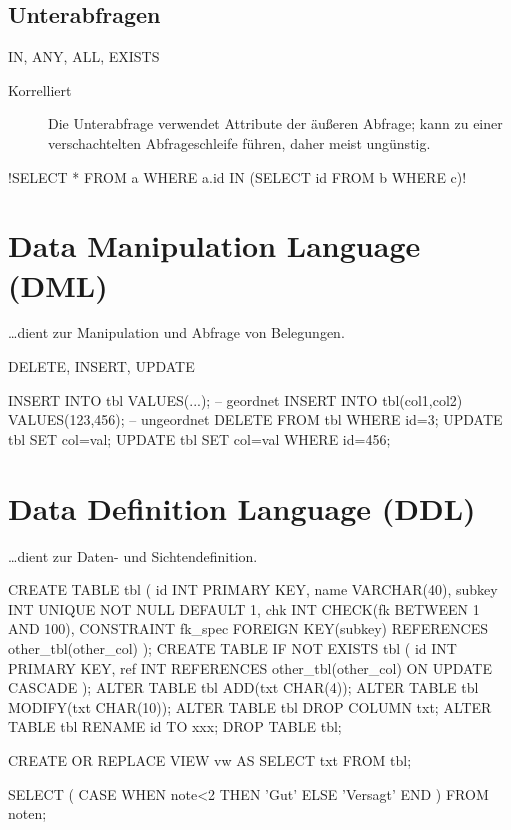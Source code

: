 \subsection{Unterabfragen}

IN, ANY, ALL, EXISTS
\begin{description}
  \item [{Korrelliert}] Die Unterabfrage verwendet Attribute der äußeren Abfrage; kann zu einer verschachtelten Abfrageschleife führen, daher meist ungünstig.
\end{description}


\sqli!SELECT * FROM a WHERE a.id IN (SELECT id FROM b WHERE c)!

\section{Data Manipulation Language (DML)}

\ldots dient zur Manipulation und Abfrage von Belegungen.

DELETE, INSERT, UPDATE

\begin{sqlcode}
INSERT INTO tbl VALUES(...); -- geordnet
INSERT INTO tbl(col1,col2) VALUES(123,456); -- ungeordnet
DELETE FROM tbl WHERE id=3;
UPDATE tbl SET col=val;
UPDATE tbl SET col=val WHERE id=456;
\end{sqlcode}


\section{Data Definition Language (DDL)}

\ldots dient zur Daten- und Sichtendefinition. 

\begin{sqlcode}
CREATE TABLE tbl (
  id INT PRIMARY KEY,
  name VARCHAR(40),
  subkey INT UNIQUE NOT NULL DEFAULT 1,
  chk INT CHECK(fk BETWEEN 1 AND 100),
  CONSTRAINT fk_spec FOREIGN KEY(subkey) REFERENCES other_tbl(other_col)
);
CREATE TABLE IF NOT EXISTS tbl (
  id INT PRIMARY KEY,
  ref INT REFERENCES other_tbl(other_col) ON UPDATE CASCADE
);
ALTER TABLE tbl ADD(txt CHAR(4));
ALTER TABLE tbl MODIFY(txt CHAR(10));
ALTER TABLE tbl DROP COLUMN txt;
ALTER TABLE tbl RENAME id TO xxx;
DROP TABLE tbl;

CREATE OR REPLACE VIEW vw AS
  SELECT txt FROM tbl;

SELECT (
  CASE WHEN note<2
  THEN 'Gut'
  ELSE 'Versagt'
  END
) FROM noten;
\end{sqlcode}


